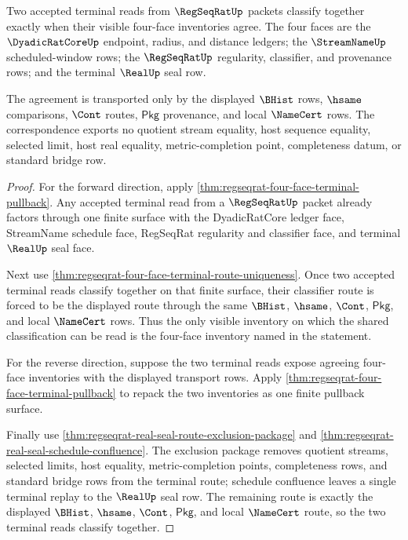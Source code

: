 \begin{theorem}
\label{thm:regseqrat-terminal-four-face-correspondence}
Two accepted terminal reads from $\RegSeqRatUp$ packets classify together
exactly when their visible four-face inventories agree. The four faces are the
$\DyadicRatCoreUp$ endpoint, radius, and distance ledgers; the $\StreamNameUp$
scheduled-window rows; the $\RegSeqRatUp$ regularity, classifier, and
provenance rows; and the terminal $\RealUp$ seal row.

The agreement is transported only by the displayed $\BHist$ rows, $\hsame$
comparisons, $\Cont$ routes, $\mathsf{Pkg}$ provenance, and local $\NameCert$
rows. The correspondence exports no quotient stream equality, host sequence
equality, selected limit, host real equality, metric-completion point,
completeness datum, or standard bridge row.
\end{theorem}
\begin{proof}
For the forward direction, apply
\autoref{thm:regseqrat-four-face-terminal-pullback}. Any accepted terminal
read from a $\RegSeqRatUp$ packet already factors through one finite surface
with the DyadicRatCore ledger face, StreamName schedule face, RegSeqRat
regularity and classifier face, and terminal $\RealUp$ seal face.

Next use
\autoref{thm:regseqrat-four-face-terminal-route-uniqueness}. Once two accepted
terminal reads classify together on that finite surface, their classifier
route is forced to be the displayed route through the same $\BHist$, $\hsame$,
$\Cont$, $\mathsf{Pkg}$, and local $\NameCert$ rows. Thus the only visible
inventory on which the shared classification can be read is the four-face
inventory named in the statement.

For the reverse direction, suppose the two terminal reads expose agreeing
four-face inventories with the displayed transport rows. Apply
\autoref{thm:regseqrat-four-face-terminal-pullback} to repack the two
inventories as one finite pullback surface.

Finally use \autoref{thm:regseqrat-real-seal-route-exclusion-package} and
\autoref{thm:regseqrat-real-seal-schedule-confluence}. The exclusion package
removes quotient streams, selected limits, host equality, metric-completion
points, completeness rows, and standard bridge rows from the terminal route;
schedule confluence leaves a single terminal replay to the $\RealUp$ seal row.
The remaining route is exactly the displayed $\BHist$, $\hsame$, $\Cont$,
$\mathsf{Pkg}$, and local $\NameCert$ route, so the two terminal reads classify
together.
\end{proof}

